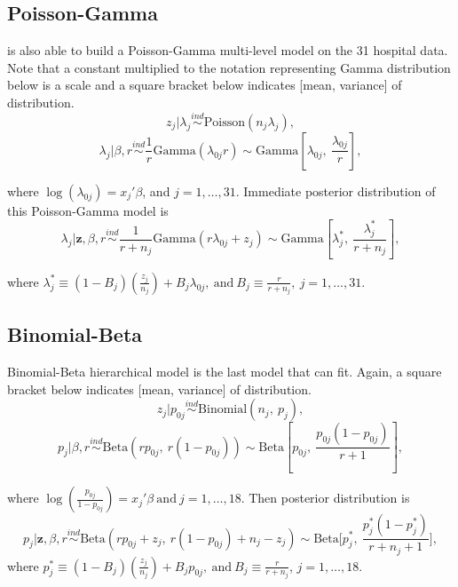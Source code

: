 \documentclass[article]{jss}
\begin{document}
\subsection[Poisson-Gamma]{Poisson-Gamma}
 is also able to build a Poisson-Gamma multi-level model on the 31 hospital data. Note that a constant multiplied to the notation representing Gamma distribution below is a scale and a square bracket below indicates [mean, variance] of distribution.
\begin{equation}
z_{j}\vert \lambda_{j} \stackrel{ind}{\sim}\textrm{Poisson}(n_{j}\lambda_{j}),
\end{equation}
\begin{equation}
\lambda_{j}\vert \beta, r\stackrel{ind}{\sim}\frac{1}{r}\textrm{Gamma}(\lambda_{0j}r)\sim \textrm{Gamma}[\lambda_{0j}, ~\frac{\lambda_{0j}}{r}],
\end{equation}

where $\log(\lambda_{0j}) =x_{j}'\beta$, and $j=1, \ldots, 31$. Immediate posterior distribution of this Poisson-Gamma model is
\begin{equation}
\lambda_{j}\vert \textbf{z}, \beta, r \stackrel{ind}{\sim}\frac{1}{r + n_{j}}\textrm{Gamma}(r\lambda_{0j} + z_{j})\sim\textrm{Gamma}[\lambda^{\ast}_{j},~\frac{\lambda^{\ast}_{j}}{r+n_{j}}],
\end{equation}

where $\lambda^{\ast}_{j} \equiv (1-B_{j})(\frac{z_{j}}{n_{j}}) + B_{j}\lambda_{0j},~\textrm{and}~ B_{j}\equiv \frac{r}{r+n_{j}},~ j=1, \ldots, 31$. 

\subsection[Binomial-Beta]{Binomial-Beta}
Binomial-Beta hierarchical model is the last model that  can fit. Again, a square bracket below indicates [mean, variance] of distribution.
\begin{equation}
z_{j} \vert p_{0j}\stackrel{ind}{\sim}\textrm{Binomial}(n_{j}, ~p_{j}),
\end{equation}
\begin{equation}
p_{j} \vert \beta, r\stackrel{ind}{\sim}\textrm{Beta}(rp_{0j},~ r(1-p_{0j}))\sim \textrm{Beta}[p_{0j}, ~\frac{p_{0j}(1-p_{0j})}{r + 1}],
\end{equation}

where $\log(\frac{p_{0j}}{1-p_{0j}}) =x_{j}'\beta~\textrm{and}~j=1, \ldots, 18$. Then posterior distribution is
\begin{equation}
p_{j}\vert \textbf{z}, \beta, r \stackrel{ind}{\sim}\textrm{Beta}(rp_{0j}+z_{j},~r(1-p_{0j})+n_{j}-z_{j})\sim\textrm{Beta}\bigg[p^{\ast}_{j},~ \frac{p^{\ast}_{j}(1-p^{\ast}_{j})}{r+n_{j}+1}\bigg],
\end{equation}
where $p^{\ast}_{j}\equiv(1-B_{j})(\frac{z_{j}}{n_{j}})+B_{j}p_{0j},~ \textrm{and}~ B_{j}\equiv\frac{r}{r+n_{j}}$, $j=1,\ldots,18$.
\end{document}
